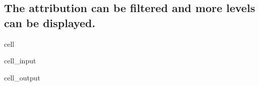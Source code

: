 \documentclass[letterpaper,10pt,english]{jupyterBook}
\begin{document}
\subsection{The attribution can be filtered and more levels can be displayed.}
\label{\detokenize{content/06_ModelAnalytics/Attribution:the-attribution-can-be-filtered-and-more-levels-can-be-displayed}}
\begin{sphinxuseclass}{cell}\begin{sphinxVerbatimInput}

\begin{sphinxuseclass}{cell_input}
\begin{sphinxVerbatim}[commandchars=\\\{\}]
\PYG{p}{[}\PYG{p}{]} 
\end{sphinxVerbatim}

\end{sphinxuseclass}\end{sphinxVerbatimInput}
\begin{sphinxVerbatimOutput}

\begin{sphinxuseclass}{cell_output}
\noindent{}

\end{sphinxuseclass}\end{sphinxVerbatimOutput}

\end{sphinxuseclass}
\end{document}
